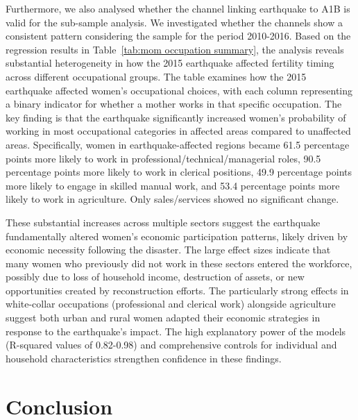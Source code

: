\documentclass[11pt,a4paper]{article}
\begin{document}
Furthermore, we also analysed whether the channel linking earthquake to A1B is valid for the sub-sample analysis. We investigated whether the channels show a consistent pattern considering the sample for the period 2010-2016.
Based on the regression results in Table~\ref{tab:mom occupation summary}, the analysis reveals substantial heterogeneity in how the 2015 earthquake affected fertility timing across different occupational groups.
The table examines how the 2015 earthquake affected women's occupational choices, with each column representing a binary indicator for whether a mother works in that specific occupation. The key finding is that the earthquake significantly increased women's probability of working in most occupational categories in affected areas compared to unaffected areas. Specifically, women in earthquake-affected regions became 61.5 percentage points more likely to work in professional/technical/managerial roles, 90.5 percentage points more likely to work in clerical positions, 49.9 percentage points more likely to engage in skilled manual work, and 53.4 percentage points more likely to work in agriculture. Only sales/services showed no significant change.

\vspace{0.25cm}



\vspace{0.25cm}

These substantial increases across multiple sectors suggest the earthquake fundamentally altered women's economic participation patterns, likely driven by economic necessity following the disaster. The large effect sizes indicate that many women who previously did not work in these sectors entered the workforce, possibly due to loss of household income, destruction of assets, or new opportunities created by reconstruction efforts. The particularly strong effects in white-collar occupations (professional and clerical work) alongside agriculture suggest both urban and rural women adapted their economic strategies in response to the earthquake's impact. The high explanatory power of the models (R-squared values of 0.82-0.98) and comprehensive controls for individual and household characteristics strengthen confidence in these findings.

\vspace{0.25cm}

\section{Conclusion}
\end{document}
